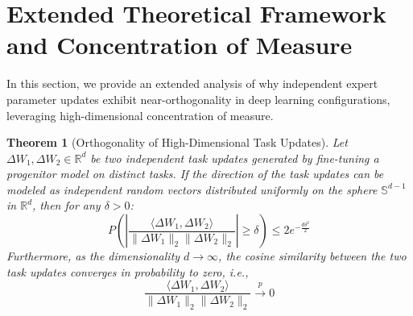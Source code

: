 \documentclass{article}
\theoremstyle{plain}
\newtheorem{theorem}{Theorem}[section]
\theoremstyle{definition}
\theoremstyle{remark}
\begin{document}



\newpage
\appendix
\onecolumn

\section{Extended Theoretical Framework and Concentration of Measure}
\label{appendix:theory}
In this section, we provide an extended analysis of why independent expert parameter updates exhibit near-orthogonality in deep learning configurations, leveraging high-dimensional concentration of measure.

\begin{theorem}[Orthogonality of High-Dimensional Task Updates]
Let $\Delta W_1, \Delta W_2 \in \mathbb{R}^{d}$ be two independent task updates generated by fine-tuning a progenitor model on distinct tasks. If the direction of the task updates can be modeled as independent random vectors distributed uniformly on the sphere $\mathbb{S}^{d-1}$ in $\mathbb{R}^d$, then for any $\delta > 0$:
\begin{equation}
    P\left( \left| \frac{\langle \Delta W_1, \Delta W_2 \rangle}{\|\Delta W_1\|_2 \|\Delta W_2\|_2} \right| \geq \delta \right) \leq 2 e^{-\frac{d \delta^2}{2}}
\end{equation}
Furthermore, as the dimensionality $d \to \infty$, the cosine similarity between the two task updates converges in probability to zero, i.e.,
\begin{equation}
    \frac{\langle \Delta W_1, \Delta W_2 \rangle}{\|\Delta W_1\|_2 \|\Delta W_2\|_2} \xrightarrow{p} 0
\end{equation}
\end{theorem}
\end{document}
